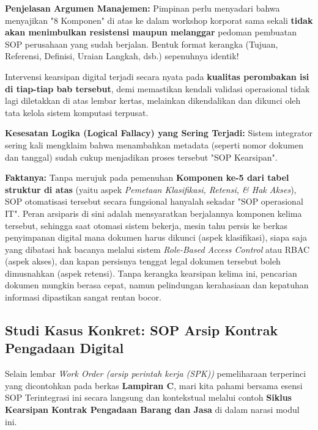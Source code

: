 \documentclass[12pt,a4paper]{report}
\begin{document}
\begin{plnbox}
\small
\textbf{Penjelasan Argumen Manajemen:} 
Pimpinan perlu menyadari bahwa menyajikan "8 Komponen" di atas ke dalam workshop korporat sama sekali \textbf{tidak akan menimbulkan resistensi maupun melanggar} pedoman pembuatan SOP perusahaan yang sudah berjalan. Bentuk format kerangka (Tujuan, Referensi, Definisi, Uraian Langkah, dsb.) sepenuhnya identik!

Intervensi kearsipan digital terjadi secara nyata pada \textbf{kualitas perombakan isi di tiap-tiap bab tersebut}, demi memastikan kendali validasi operasional tidak lagi diletakkan di atas lembar kertas, melainkan dikendalikan dan dikunci oleh tata kelola sistem komputasi terpusat.
\end{plnbox}

\begin{plnbox}
\small
\textbf{Kesesatan Logika (Logical Fallacy) yang Sering Terjadi:} Sistem integrator sering kali mengklaim bahwa menambahkan metadata (seperti nomor dokumen dan tanggal) sudah cukup menjadikan proses tersebut "SOP Kearsipan". 

\textbf{Faktanya:} Tanpa merujuk pada pemenuhan \textbf{Komponen ke-5 dari tabel struktur di atas} (yaitu aspek \textit{Pemetaan Klasifikasi, Retensi, \& Hak Akses}), SOP otomatisasi tersebut secara fungsional hanyalah sekadar "SOP operasional IT". Peran arsiparis di sini adalah mensyaratkan berjalannya komponen kelima tersebut, sehingga saat otomasi sistem bekerja, mesin tahu persis ke berkas penyimpanan digital mana dokumen harus dikunci (aspek klasifikasi), siapa saja yang dibatasi hak bacanya melalui sistem \textit{Role-Based Access Control} atau RBAC (aspek akses), dan kapan persisnya tenggat legal dokumen tersebut boleh dimusnahkan (aspek retensi). Tanpa kerangka kearsipan kelima ini, pencarian dokumen mungkin berasa cepat, namun pelindungan kerahasiaan dan kepatuhan informasi dipastikan sangat rentan bocor.
\end{plnbox}

\subsection{Studi Kasus Konkret: SOP Arsip Kontrak Pengadaan Digital}
Selain lembar \textit{Work Order (arsip perintah kerja (SPK))} pemeliharaan terperinci yang dicontohkan pada berkas \textbf{Lampiran C}, mari kita pahami bersama esensi SOP Terintegrasi ini secara langsung dan kontekstual melalui contoh \textbf{Siklus Kearsipan Kontrak Pengadaan Barang dan Jasa} di dalam narasi modul ini. 
\end{document}
